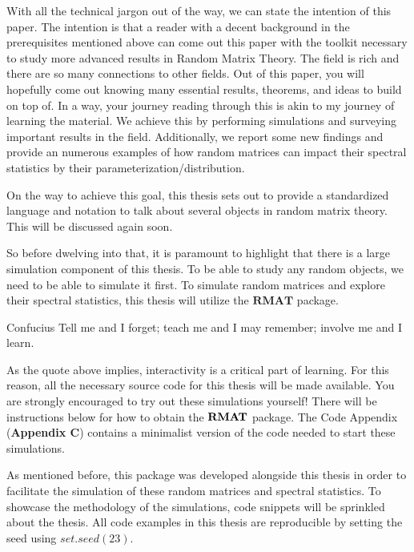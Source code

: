 With all the technical jargon out of the way, we can state the intention of this paper.
The intention is that a reader with a decent background in the prerequisites mentioned above can come out this paper with the toolkit necessary to study more advanced results in Random Matrix Theory.
The field is rich and there are so many connections to other fields. Out of this paper, you will hopefully come out knowing many essential results, theorems, and ideas to build on top of.
In a way, your journey reading through this is akin to my journey of learning the material. We achieve this by performing simulations and surveying important results in the field. Additionally, we report some
new findings and provide an numerous examples of how random matrices can impact their spectral statistics by their parameterization/distribution.

On the way to achieve this goal, this thesis sets out to provide a standardized language and notation to talk about several objects in random matrix theory. This will be discussed again soon.

So before dwelving into that, it is paramount to highlight that there is a large simulation component of this thesis. To be able to study any random objects, we need to be able to simulate it first.
To simulate random matrices and explore their spectral statistics, this thesis will utilize the $\textbf{RMAT}$ package.


\begin{aquote}{Confucius}
Tell me and I forget; teach me and I may remember; involve me and I learn.
\end{aquote}

As the quote above implies, interactivity is a critical part of learning.
For this reason, all the necessary source code for this thesis will be made available. You are strongly encouraged to try out these simulations yourself!
There will be instructions below for how to obtain the ${\textbf{RMAT}}$ package. The Code Appendix (\textbf{Appendix C}) contains a minimalist version of the code
needed to start these simulations.

As mentioned before, this package was developed alongside this thesis in order to facilitate the simulation of these random matrices and spectral statistics.
To showcase the methodology of the simulations, code snippets will be sprinkled about the thesis. All code examples in this thesis are reproducible by setting
the seed using $set.seed(23)$.

